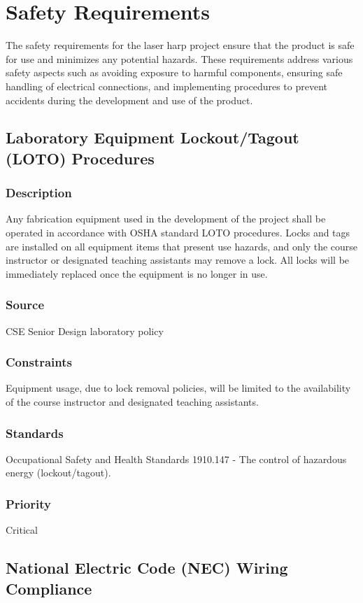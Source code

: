 \section{Safety Requirements}

The safety requirements for the laser harp project ensure that the product is safe for use and minimizes any potential hazards. These requirements address various safety aspects such as avoiding exposure to harmful components, ensuring safe handling of electrical connections, and implementing procedures to prevent accidents during the development and use of the product.

\subsection{Laboratory Equipment Lockout/Tagout (LOTO) Procedures}
\subsubsection{Description}
Any fabrication equipment used in the development of the project shall be operated in accordance with OSHA standard LOTO procedures. Locks and tags are installed on all equipment items that present use hazards, and only the course instructor or designated teaching assistants may remove a lock. All locks will be immediately replaced once the equipment is no longer in use.
\subsubsection{Source}
CSE Senior Design laboratory policy
\subsubsection{Constraints}
Equipment usage, due to lock removal policies, will be limited to the availability of the course instructor and designated teaching assistants.
\subsubsection{Standards}
Occupational Safety and Health Standards 1910.147 - The control of hazardous energy (lockout/tagout).
\subsubsection{Priority}
Critical

\subsection{National Electric Code (NEC) Wiring Compliance}
